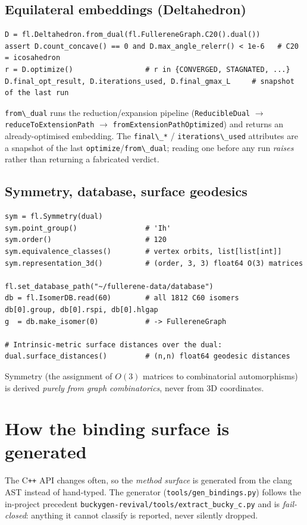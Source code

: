 \documentclass[11pt]{article}
\newcommand{\code}[1]{\lstinline[style=py]!#1!}
\begin{document}
\subsection{Equilateral embeddings (Deltahedron)}
\begin{lstlisting}
D = fl.Deltahedron.from_dual(fl.FullereneGraph.C20().dual())
assert D.count_concave() == 0 and D.max_angle_relerr() < 1e-6   # C20 = icosahedron
r = D.optimize()                 # r in {CONVERGED, STAGNATED, ...}
D.final_opt_result, D.iterations_used, D.final_gmax_L     # snapshot of the last run
\end{lstlisting}
\code{from\_dual} runs the reduction/expansion pipeline
(\texttt{ReducibleDual} $\to$ \texttt{reduceToExtensionPath} $\to$ \texttt{fromExtensionPathOptimized})
and returns an already-optimised embedding. The \code{final\_*} / \code{iterations\_used}
attributes are a snapshot of the last \code{optimize}/\code{from\_dual}; reading one before
any run \emph{raises} rather than returning a fabricated verdict.

\subsection{Symmetry, database, surface geodesics}
\begin{lstlisting}
sym = fl.Symmetry(dual)
sym.point_group()                # 'Ih'
sym.order()                      # 120
sym.equivalence_classes()        # vertex orbits, list[list[int]]
sym.representation_3d()          # (order, 3, 3) float64 O(3) matrices

fl.set_database_path("~/fullerene-data/database")
db = fl.IsomerDB.read(60)        # all 1812 C60 isomers
db[0].group, db[0].rspi, db[0].hlgap
g  = db.make_isomer(0)           # -> FullereneGraph

# Intrinsic-metric surface distances over the dual:
dual.surface_distances()         # (n,n) float64 geodesic distances
\end{lstlisting}
Symmetry (the assignment of $O(3)$ matrices to combinatorial automorphisms) is derived
\emph{purely from graph combinatorics}, never from $3$D coordinates.

\section{How the binding surface is generated}
\label{sec:gen}

The C\texttt{++} API changes often, so the \emph{method surface} is generated from the
clang AST instead of hand-typed. The generator (\texttt{tools/gen\_bindings.py}) follows the
in-project precedent \texttt{buckygen-revival/tools/extract\_bucky\_c.py} and is
\emph{fail-closed}: anything it cannot classify is reported, never silently dropped.
\end{document}

